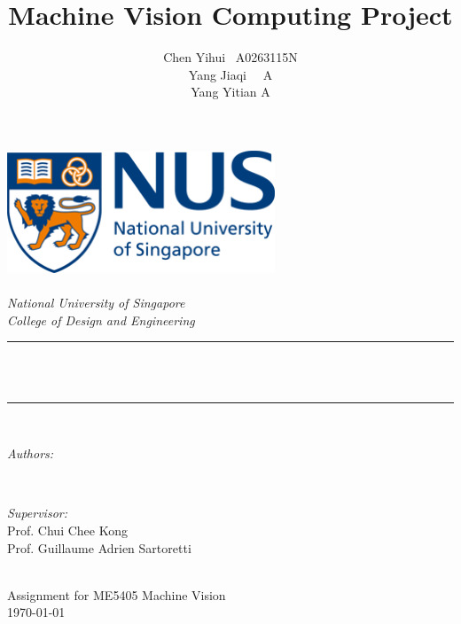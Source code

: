 \documentclass[hyperref]{article}
\title{Machine Vision Computing Project}
\author{\textup{Chen Yihui \ A0263115N\\
				Yang Jiaqi \ \ A\\
			    Yang Yitian  A}}
\theoremstyle{nonumberplain}
\begin{document}
	\begin{titlepage}
		\center
		\newcommand{\HRule}{\rule{\linewidth}{0.5mm}}
		\includegraphics[width=8cm]{logo.png}\\[1cm] 
		\quad\\[1.5cm]
		\textsl{\Large National University of Singapore}\\[0.5cm] 
		\textsl{\large College of Design and Engineering}\\[0.5cm]
		\makeatletter
		\HRule \\[0.4cm]
		{ \huge \bfseries \@title}\\[0.4cm] 
		\HRule \\[1.5cm]
		\begin{minipage}{0.4\textwidth}
			\begin{flushleft} \large
				\emph{Authors:}\\
				\@author 
			\end{flushleft}
		\end{minipage}
		~
		\begin{minipage}{0.4\textwidth}
			\begin{flushright} \large
				\emph{Supervisor:} \\
				\textup{Prof. Chui Chee Kong\\
						Prof. Guillaume Adrien Sartoretti}
			\end{flushright}
		\end{minipage}\\[3cm]
		\makeatother
		{\Large Assignment for ME5405 Machine Vision}\\[0.5cm]
		{\large \today}\\[2cm] 
		\vfill 
	\end{titlepage}
	

	\begin{abstract}

	
	
	\end{abstract}
	
\end{document}

